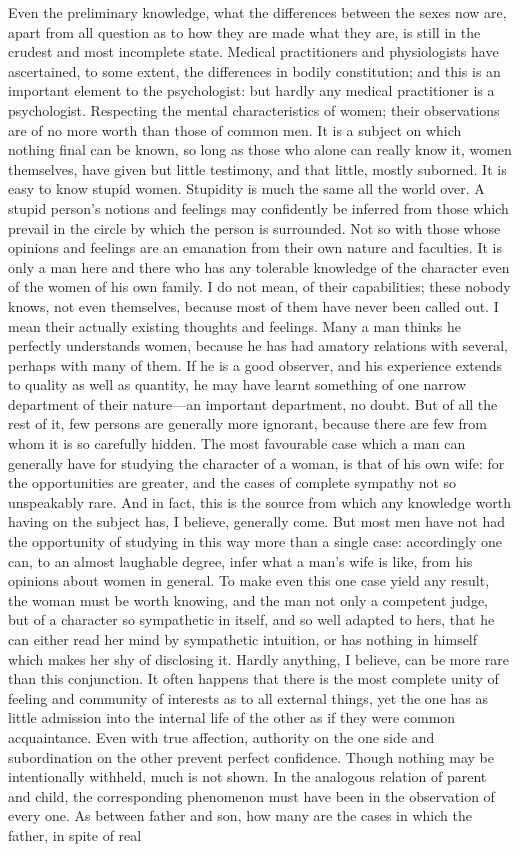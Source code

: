 \documentclass[12pt]{report}
\begin{document}
Even the preliminary knowledge, what the differences between the sexes now are, apart from all question as to how they are made what they are, is still in the crudest and most incomplete state. Medical practitioners and physiologists have ascertained, to some extent, the differences in bodily constitution; and this is an important element to the psychologist: but hardly any medical practitioner is a psychologist. Respecting the mental characteristics of women; their observations are of no more worth than those of common men. It is a subject on which nothing final can be known, so long as those who alone can really know it, women themselves, have given but little testimony, and that little, mostly suborned. It is easy to know stupid women. Stupidity is much the same all the world over. A stupid person's notions and feelings may confidently be inferred from those which prevail in the circle by which the person is surrounded. Not so with those whose opinions and feelings are an emanation from their own nature and faculties. It is only a man here and there who has any tolerable knowledge of the character even of the women of his own family. I do not mean, of their capabilities; these nobody knows, not even themselves, because most of them have never been called out. I mean their actually existing thoughts and feelings. Many a man thinks he perfectly understands women, because he has had amatory relations with several, perhaps with many of them. If he is a good observer, and his experience extends to quality as well as quantity, he may have learnt something of one narrow department of their nature—an important department, no doubt. But of all the rest of it, few persons are generally more ignorant, because there are few from whom it is so carefully hidden. The most favourable case which a man can generally have for studying the character of a woman, is that of his own wife: for the opportunities are greater, and the cases of complete sympathy not so unspeakably rare. And in fact, this is the source from which any knowledge worth having on the subject has, I believe, generally come. But most men have not had the opportunity of studying in this way more than a single case: accordingly one can, to an almost laughable degree, infer what a man's wife is like, from his opinions about women in general. To make even this one case yield any result, the woman must be worth knowing, and the man not only a competent judge, but of a character so sympathetic in itself, and so well adapted to hers, that he can either read her mind by sympathetic intuition, or has nothing in himself which makes her shy of disclosing it. Hardly anything, I believe, can be more rare than this conjunction. It often happens that there is the most complete unity of feeling and community of interests as to all external things, yet the one has as little admission into the internal life of the other as if they were common acquaintance. Even with true affection, authority on the one side and subordination on the other prevent perfect confidence. Though nothing may be intentionally withheld, much is not shown. In the analogous relation of parent and child, the corresponding phenomenon must have been in the observation of every one. As between father and son, how many are the cases in which the father, in spite of real 
\end{document}
